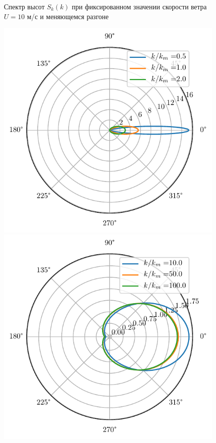 \begin{figure}[h!]
\begin{minipage}{0.49\linewidth}
			\caption{Спектр высот $S_k(k)$ при фиксированном значении скорости ветра 
			$U=10$ м/с и меняющемся разгоне}		
			\label{fig:full_spectrum2}
	\end{minipage}
\end{figure}


\begin{figure}[h!]
	\begin{minipage}{0.49\linewidth}
			\centering
			\includegraphics[width=\linewidth]{fig/full_angles1.pdf}	
	\end{minipage}
	\hfill
	\begin{minipage}{0.49\linewidth}
			\centering
			\includegraphics[width=\linewidth]{fig/full_angles2.pdf}

\end{minipage}
\end{figure}
